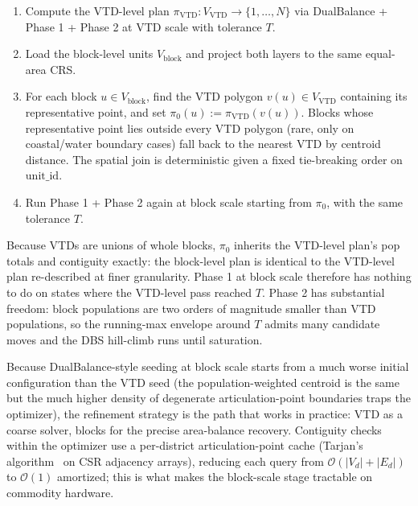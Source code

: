 \begin{enumerate}
  \item Compute the VTD-level plan
        $\pi_{\mathrm{VTD}}: V_{\mathrm{VTD}} \to \{1, \ldots, N\}$
        via DualBalance + Phase 1 + Phase 2 at VTD scale with tolerance $T$.
  \item Load the block-level units $V_{\mathrm{block}}$ and project
        both layers to the same equal-area CRS.
  \item For each block $u \in V_{\mathrm{block}}$, find the VTD
        polygon $v(u) \in V_{\mathrm{VTD}}$ containing its
        representative point, and set
        $\pi_0(u) := \pi_{\mathrm{VTD}}(v(u))$. Blocks whose
        representative point lies outside every VTD polygon (rare,
        only on coastal/water boundary cases) fall back to the
        nearest VTD by centroid distance. The spatial join is
        deterministic given a fixed tie-breaking order on
        $\mathrm{unit\_id}$.
  \item Run Phase 1 + Phase 2 again at block scale starting from
        $\pi_0$, with the same tolerance $T$.
\end{enumerate}

Because VTDs are unions of whole blocks, $\pi_0$ inherits the
VTD-level plan's pop totals and contiguity exactly: the block-level
plan is identical to the VTD-level plan re-described at finer
granularity. Phase 1 at block scale therefore has nothing to do on
states where the VTD-level pass reached $T$. Phase 2 has substantial
freedom: block populations are two orders of magnitude smaller than
VTD populations, so the running-max envelope around $T$ admits many
candidate moves and the DBS hill-climb runs until saturation.

Because DualBalance-style seeding at block scale starts from a much worse
initial configuration than the VTD seed (the population-weighted
centroid is the same but the much higher density of degenerate
articulation-point boundaries traps the optimizer), the refinement
strategy is the path that works in practice: VTD as a coarse
solver, blocks for the precise area-balance recovery. Contiguity
checks within the optimizer use a per-district articulation-point
cache (Tarjan's algorithm~\cite{tarjan1972} on CSR adjacency arrays),
reducing each query from $\mathcal{O}(|V_d|+|E_d|)$ to
$\mathcal{O}(1)$ amortized; this is what makes the block-scale stage
tractable on commodity hardware.

